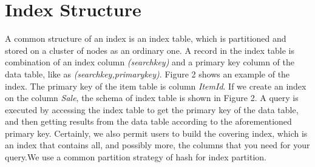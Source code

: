\section{Index Structure}
\vspace{-0.2cm}
A common structure of an index is an index table, which is partitioned and stored on a cluster of nodes as an ordinary one. A record in the index table is combination of an index column \emph{(searchkey)} and a primary key column of the data table, like as  \emph{(searchkey,primarykey)}. Figure 2 shows an example of the index. The primary key of the item table is column \emph{ItemId}. If we create an index on the column \emph{Sale}, the schema of index table is shown in Figure 2. A query is executed by accessing the index table to get the primary key of the data table, and then getting results from the data table according to the aforementioned primary key. Certainly, we also permit users to build the covering index, which is an index that contains all, and possibly more, the columns that you need for your query.We use a common partition strategy of hash for index partition.

